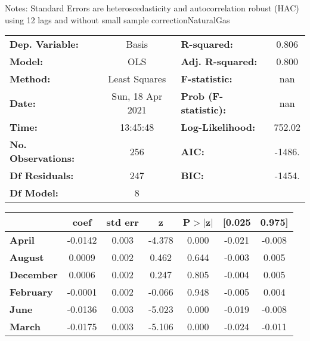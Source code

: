 Notes: \newline
 [1] Standard Errors are heteroscedasticity and autocorrelation robust (HAC) using 12 lags and without small sample correctionNaturalGas\begin{center}
\begin{tabular}{lclc}
\toprule
\textbf{Dep. Variable:}    &      Basis       & \textbf{  R-squared:         } &     0.806   \\
\textbf{Model:}            &       OLS        & \textbf{  Adj. R-squared:    } &     0.800   \\
\textbf{Method:}           &  Least Squares   & \textbf{  F-statistic:       } &       nan   \\
\textbf{Date:}             & Sun, 18 Apr 2021 & \textbf{  Prob (F-statistic):} &      nan    \\
\textbf{Time:}             &     13:45:48     & \textbf{  Log-Likelihood:    } &    752.02   \\
\textbf{No. Observations:} &         256      & \textbf{  AIC:               } &    -1486.   \\
\textbf{Df Residuals:}     &         247      & \textbf{  BIC:               } &    -1454.   \\
\textbf{Df Model:}         &           8      & \textbf{                     } &             \\
\bottomrule
\end{tabular}
\begin{tabular}{lcccccc}
                  & \textbf{coef} & \textbf{std err} & \textbf{z} & \textbf{P$> |$z$|$} & \textbf{[0.025} & \textbf{0.975]}  \\
\midrule
\textbf{April}    &      -0.0142  &        0.003     &    -4.378  &         0.000        &       -0.021    &       -0.008     \\
\textbf{August}   &       0.0009  &        0.002     &     0.462  &         0.644        &       -0.003    &        0.005     \\
\textbf{December} &       0.0006  &        0.002     &     0.247  &         0.805        &       -0.004    &        0.005     \\
\textbf{February} &      -0.0001  &        0.002     &    -0.066  &         0.948        &       -0.005    &        0.004     \\
\textbf{June}     &      -0.0136  &        0.003     &    -5.023  &         0.000        &       -0.019    &       -0.008     \\
\textbf{March}    &      -0.0175  &        0.003     &    -5.106  &         0.000        &       -0.024    &       -0.011     \\

\end{tabular}
\end{center}
